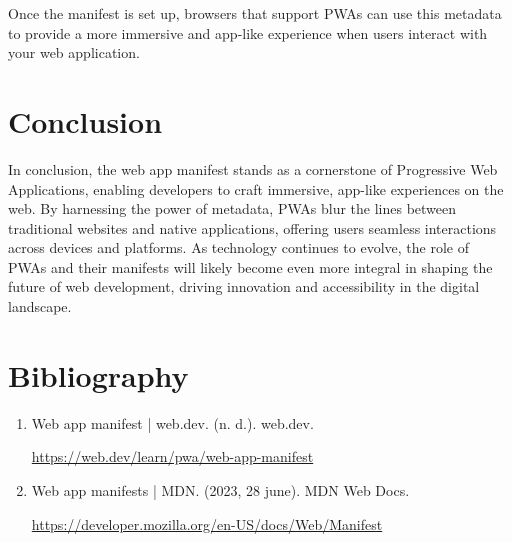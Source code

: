 \documentclass[12pt,a4paper]{article}
\begin{document}
Once the manifest is set up, browsers that support PWAs can use this metadata to provide a more immersive and app-like experience when users interact with your web application.

\section{Conclusion}

In conclusion, the web app manifest stands as a cornerstone of Progressive Web Applications, enabling developers to craft immersive, app-like experiences on the web. By harnessing the power of metadata, PWAs blur the lines between traditional websites and native applications, offering users seamless interactions across devices and platforms. As technology continues to evolve, the role of PWAs and their manifests will likely become even more integral in shaping the future of web development, driving innovation and accessibility in the digital landscape.

    \clearpage

	\section{Bibliography}

    \begin{enumerate}
    
      \item Web app manifest  |  web.dev. (n. d.). web.dev.
      
    \href{https://web.dev/learn/pwa/web-app-manifest}{https://web.dev/learn/pwa/web-app-manifest}

      \item Web app manifests | MDN. (2023, 28 june). MDN Web Docs.
        
      \href{https://developer.mozilla.org/en-US/docs/Web/Manifest}{https://developer.mozilla.org/en-US/docs/Web/Manifest}
      
    \end{enumerate}
	
	
\end{document}
